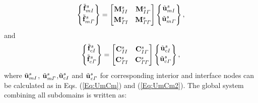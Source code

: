 \documentclass{article}
\begin{document}
\begin{equation}\label{Eq.fmis}
{\begin{Bmatrix}
   \tilde{\bf{f}}_{mI}^s
\\[0.3em]
    \tilde{\bf{f}}_{m\it{\Gamma}}^s
\\[0.3em]
\end{Bmatrix} }=
\begin{bmatrix}
    \mathbf{M}_{II}^s & \mathbf{M}_{I \it{\Gamma}}^s
\\[0.3em]
     \mathbf{M}_{\it{\Gamma} I}^s & \mathbf{M}_{\it{\Gamma} \it{\Gamma}}^s
\end{bmatrix}
\begin{Bmatrix}
     \tilde{\bf{u}}_{mI}^s
\\[0.3em]
     \tilde{\bf{u}}_{m\it{\Gamma}} ^s
\\[0.3em]
\end{Bmatrix},
\end{equation}
and
\begin{equation}\label{Eq.fcis}
{\begin{Bmatrix}
   \tilde{\bf{f}}_{cI}^s
\\[0.3em]
    \tilde{\bf{f}}_{c\it{\Gamma}}^s
\\[0.3em]
\end{Bmatrix} }=
\begin{bmatrix}
    \mathbf{C}_{II}^s & \mathbf{C}_{I \it{\Gamma}}^s
\\[0.3em]
     \mathbf{C}_{\it{\Gamma} I}^s & \mathbf{C}_{\it{\Gamma} \it{\Gamma}}^s
\end{bmatrix}
\begin{Bmatrix}
     \tilde{\bf{u}}_{cI}^s
\\[0.3em]
     \tilde{\bf{u}}_{c\it{\Gamma}} ^s
\\[0.3em]
\end{Bmatrix},
\end{equation}
where $\tilde{\bf{u}}_{mI}^s$, $\tilde{\bf{u}}_{\it{m \Gamma}}^s$,$\tilde{\bf{u}}_{cI}^s$ and $\tilde{\bf{u}}_{\it{c\Gamma}}^s$ for corresponding interior and interface nodes can be calculated as in Eqs. (\ref{Eq:UmCm}) and (\ref{Eq:UmCm2}). The global system combining all subdomains is written as:
\end{document}
